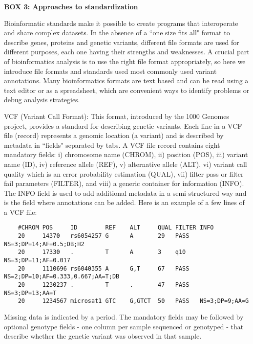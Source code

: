 \textbf{BOX 3: Approaches to standardization}
\begin{framed}
Bioinformatic standards make it possible to create programs that interoperate and share complex datasets. In the absence of a ``one size fits all" format to describe genes, proteins and genetic variants, different file formats are used for different purposes, each one having their strengths and weaknesses. A crucial part of bioinformatics analysis is to use the right file format appropriately, so here we introduce file formats and standards used most commonly used variant annotations. Many bioinformatics formats are text based and can be read using a text editor or as a spreadsheet, which are convenient ways to identify problems or debug analysis strategies.

VCF (Variant Call Format): This format, introduced by the 1000 Genomes project, provides a standard for describing genetic variants. Each line in a VCF file (record) represents a genomic location (a variant) and is described by metadata in ``fields" separated by tabs. A VCF file record contains eight mandatory fields: i) chromosome name (CHROM), ii) position (POS), iii) variant name (ID), iv) reference allele (REF), v) alternative allele (ALT), vi) variant call quality which is an error probability estimation (QUAL), vii) filter pass or filter fail parameters (FILTER), and viii) a generic container for information (INFO). The INFO field is used to add additional metadata in a semi-structured way and is the field where annotations can be added. Here is an example of a few lines of a VCF file:

\scriptsize{
	\begin{verbatim}
	#CHROM POS     ID        REF    ALT     QUAL FILTER INFO                              
	20     14370   rs6054257 G      A       29   PASS   NS=3;DP=14;AF=0.5;DB;H2           
	20     17330   .         T      A       3    q10    NS=3;DP=11;AF=0.017               
	20     1110696 rs6040355 A      G,T     67   PASS   NS=2;DP=10;AF=0.333,0.667;AA=T;DB 
	20     1230237 .         T      .       47   PASS   NS=3;DP=13;AA=T                   
	20     1234567 microsat1 GTC    G,GTCT  50   PASS   NS=3;DP=9;AA=G                    
	\end{verbatim}
}

\normalsize{
Missing data is indicated by a period. The mandatory fields may be followed by optional genotype fields - one column per sample sequenced or genotyped - that describe whether the genetic variant was observed in that sample.

}
\end{framed}
